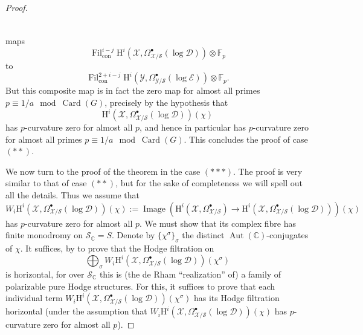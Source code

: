 \begin{proof}
\[\begin{tikzcd}[column sep=large,row sep=small]
\end{tikzcd}
\]
maps
\[
\operatorname{Fil}^{i-j}_{\mathrm{con}}\mathrm{H}^i(\mathcal{X},\Omega^\bullet_{\mathcal{X}/\mathcal{S}}(\log\mathcal{D}))\otimes\mathbb{F}_p
\]
to
\[
\operatorname{Fil}^{2+i-j}_{\mathrm{con}}\mathrm{H}^i(\mathcal{Y},\Omega^\bullet_{\mathcal{Y}/\mathcal{S}}(\log\mathcal{E}))\otimes\mathbb{F}_p.
\]
But this composite map is in fact the zero map for almost all primes \(p\equiv 1/a\mod \operatorname{Card}(G)\), precisely by the hypothesis that
\[
\mathrm{H}^i(\mathcal{X},\Omega^\bullet_{\mathcal{X}/\mathcal{S}}(\log\mathcal{D}))(\chi)
\]
has \(p\)-curvature zero for almost all \(p\), and hence in particular has \(p\)-curvature zero for almost all primes \(p\equiv 1/a\mod \operatorname{Card}(G)\). This concludes the proof of case \((**)\).

We now turn to the proof of the theorem in the case \((***)\). The proof is very similar to that of case \((**)\), but for the sake of completeness we will spell out all the details. Thus we assume that
\[
W_i\mathrm{H}^i(\mathcal{X},\Omega^\bullet_{\mathcal{X}/\mathcal{S}}(\log\mathcal{D}))(\chi):=
\operatorname{Image}(\mathrm{H}^i(\mathcal{X},\Omega^\bullet_{\mathcal{X}/\mathcal{S}})\to
\mathrm{H}^i(\mathcal{X},\Omega^\bullet_{\mathcal{X}/\mathcal{S}}(\log\mathcal{D})))(\chi)
\]
has \(p\)-curvature zero for almost all \(p\). We must show that its complex fibre has finite monodromy on \(\mathcal{S}_{\mathbb{C}}=S\). Denote by \(\{\chi^\sigma\}_\sigma\) the distinct \(\operatorname{Aut}(\mathbb{C})\)-conjugates of \(\chi\). It suffices, by \cite[4.2.1.3]{Ka-ASDE} to prove that the Hodge filtration on
\[
\bigoplus_\sigma W_i\mathrm{H}^i(\mathcal{X},\Omega^\bullet_{\mathcal{X}/\mathcal{S}}(\log\mathcal{D}))(\chi^\sigma)
\]
is horizontal, for over \(\mathcal{S}_{\mathbb{C}}\) this is (the de Rham ``realization'' of) a family of polarizable pure Hodge structures. For this, it suffices to prove that each individual term \(W_i\mathrm{H}^i(\mathcal{X},\Omega^\bullet_{\mathcal{X}/\mathcal{S}}(\log\mathcal{D}))(\chi^\sigma)\) has its Hodge filtration horizontal (under the assumption that \(W_i\mathrm{H}^i(\mathcal{X},\Omega^\bullet_{\mathcal{X}/\mathcal{S}}(\log\mathcal{D}))(\chi)\) has \(p\)-curvature zero for almost all \(p\)).


\end{proof}
